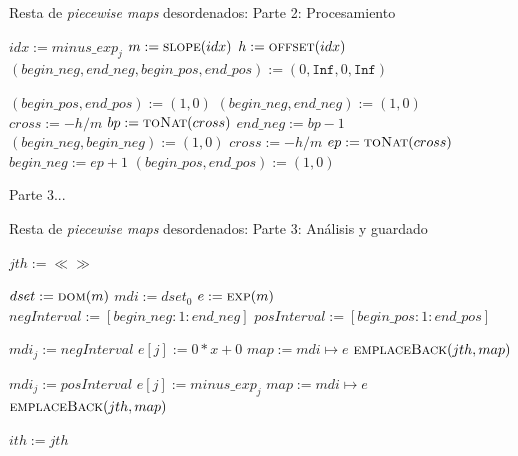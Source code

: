 \begin{algorithm}
\caption{Resta de \textit{piecewise maps} desordenados: Parte 2: Procesamiento}
\label{alg:subUnordPWMap_part2}
\begin{algorithmic}[1]
\Function{$-$}{}

    \State $idx := minus\_exp_j$
    \State $m := \Call{slope}{idx}$
    \State $h := \Call{offset}{idx}$
    \State $(begin\_neg,end\_neg,begin\_pos,end\_pos) := (0,\texttt{Inf},0,\texttt{Inf})$

        \State $(begin\_pos,end\_pos) := (1,0)$
      \Else
        \State $(begin\_neg,end\_neg) := (1,0)$
      \EndIf
      \State $cross := -h / m$
        \State $bp := \Call{toNat}{cross}$
          \State $end\_neg := bp - 1$
        \Else
          \State $(begin\_neg,begin\_neg) := (1,0)$
        \EndIf
      \EndIf
    \Else
      \State $cross := -h / m$
        \State $ep := \Call{toNat}{cross}$
          \State $begin\_neg := ep + 1$
        \EndIf
      \Else
        \State $(begin\_pos,end\_pos) := (1,0)$
      \EndIf
    \EndIf

    \State Parte 3...
    \EndFor
\EndFunction
\end{algorithmic}
\end{algorithm}


\begin{algorithm}
\caption{Resta de \textit{piecewise maps} desordenados: Parte 3: Análisis y guardado}
\label{alg:subUnordPWMap_part3}
\begin{algorithmic}[1]
\Function{$-$}{}
    \State $jth := \ll\gg$

      \State $dset := \Call{dom}{m}$
      \State $mdi := dset_0$
      \State $e := \Call{exp}{m}$
      \State $negInterval := [begin\_neg:1:end\_neg]$
      \State $posInterval := [begin\_pos:1:end\_pos]$

        \State $mdi_j := negInterval$
        \State $e[j] := 0*x+ 0$
        \State $map := mdi \mapsto e$
        \State $\Call{emplaceBack}{jth, map}$
      \EndIf

        \State $mdi_j := posInterval$
        \State $e[j] := minus\_exp_j$
        \State $map := mdi \mapsto e$
        \State $\Call{emplaceBack}{jth, map}$
      \EndIf

    \EndFor
    \State $ith := jth$
\EndFunction
\end{algorithmic}
\end{algorithm}

